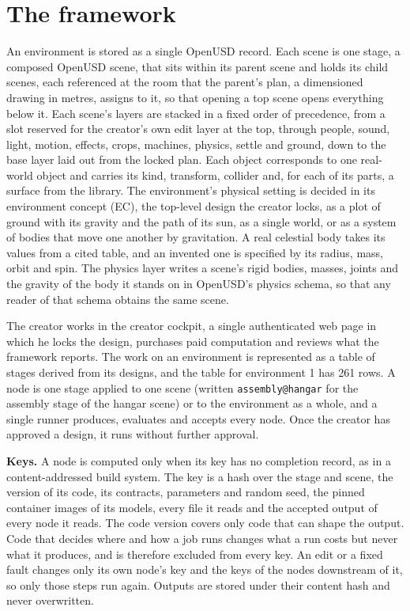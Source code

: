 \section{The framework}\label{the-framework}

An environment is stored as a single OpenUSD record. Each scene is one stage, a composed OpenUSD scene, that sits within its parent scene and holds its child scenes, each referenced at the room that the parent's plan, a dimensioned drawing in metres, assigns to it, so that opening a top scene opens everything below it. Each scene's layers are stacked in a fixed order of precedence, from a slot reserved for the creator's own edit layer at the top, through people, sound, light, motion, effects, crops, machines, physics, settle and ground, down to the base layer laid out from the locked plan. Each object corresponds to one real-world object and carries its kind, transform, collider and, for each of its parts, a surface from the library. The environment's physical setting is decided in its environment concept (EC), the top-level design the creator locks, as a plot of ground with its gravity and the path of its sun, as a single world, or as a system of bodies that move one another by gravitation. A real celestial body takes its values from a cited table, and an invented one is specified by its radius, mass, orbit and spin. The physics layer writes a scene's rigid bodies, masses, joints and the gravity of the body it stands on in OpenUSD's physics schema, so that any reader of that schema obtains the same scene.

The creator works in the creator cockpit, a single authenticated web page in which he locks the design, purchases paid computation and reviews what the framework reports. The work on an environment is represented as a table of stages derived from its designs, and the table for environment 1 has 261 rows. A node is one stage applied to one scene (written \texttt{assembly@hangar} for the assembly stage of the hangar scene) or to the environment as a whole, and a single runner produces, evaluates and accepts every node. Once the creator has approved a design, it runs without further approval.

\textbf{Keys.} A node is computed only when its key has no completion record, as in a content-addressed build system. The key is a hash over the stage and scene, the version of its code, its contracts, parameters and random seed, the pinned container images of its models, every file it reads and the accepted output of every node it reads. The code version covers only code that can shape the output. Code that decides where and how a job runs changes what a run costs but never what it produces, and is therefore excluded from every key. An edit or a fixed fault changes only its own node's key and the keys of the nodes downstream of it, so only those steps run again. Outputs are stored under their content hash and never overwritten.

